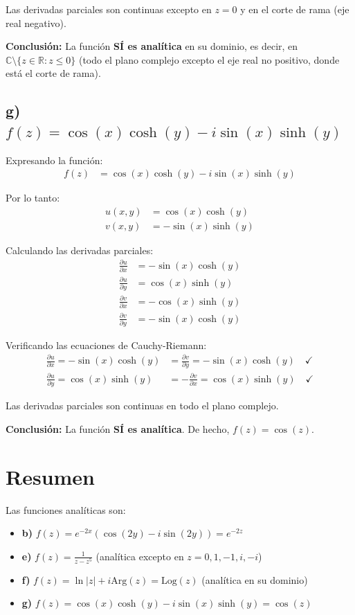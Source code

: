 \documentclass{article}
\begin{document}
Las derivadas parciales son continuas excepto en $z = 0$ y en el corte de rama (eje real negativo).

\textbf{Conclusión:} La función \textbf{SÍ es analítica} en su dominio, es decir, en $\mathbb{C} \setminus \{z \in \mathbb{R} : z \leq 0\}$ (todo el plano complejo excepto el eje real no positivo, donde está el corte de rama).

\subsection*{g) $f(z) = \cos(x)\cosh(y) - i\sin(x)\sinh(y)$}

Expresando la función:
\begin{align*}
f(z) &= \cos(x)\cosh(y) - i\sin(x)\sinh(y)
\end{align*}

Por lo tanto:
\begin{align*}
u(x,y) &= \cos(x)\cosh(y) \\
v(x,y) &= -\sin(x)\sinh(y)
\end{align*}

Calculando las derivadas parciales:
\begin{align*}
\frac{\partial u}{\partial x} &= -\sin(x)\cosh(y) \\
\frac{\partial u}{\partial y} &= \cos(x)\sinh(y) \\
\frac{\partial v}{\partial x} &= -\cos(x)\sinh(y) \\
\frac{\partial v}{\partial y} &= -\sin(x)\cosh(y)
\end{align*}

Verificando las ecuaciones de Cauchy-Riemann:
\begin{align*}
\frac{\partial u}{\partial x} = -\sin(x)\cosh(y) &= \frac{\partial v}{\partial y} = -\sin(x)\cosh(y) \quad \checkmark \\
\frac{\partial u}{\partial y} = \cos(x)\sinh(y) &= -\frac{\partial v}{\partial x} = \cos(x)\sinh(y) \quad \checkmark
\end{align*}

Las derivadas parciales son continuas en todo el plano complejo.

\textbf{Conclusión:} La función \textbf{SÍ es analítica}. De hecho, $f(z) = \cos(z)$.

\section*{Resumen}

Las funciones analíticas son:
\begin{itemize}
\item \textbf{b)} $f(z) = e^{-2x}(\cos(2y) - i\sin(2y)) = e^{-2z}$
\item \textbf{e)} $f(z) = \frac{1}{z - z^5}$ (analítica excepto en $z = 0, 1, -1, i, -i$)
\item \textbf{f)} $f(z) = \ln|z| + i\text{Arg}(z) = \text{Log}(z)$ (analítica en su dominio)
\item \textbf{g)} $f(z) = \cos(x)\cosh(y) - i\sin(x)\sinh(y) = \cos(z)$
\end{itemize}
\end{document}
